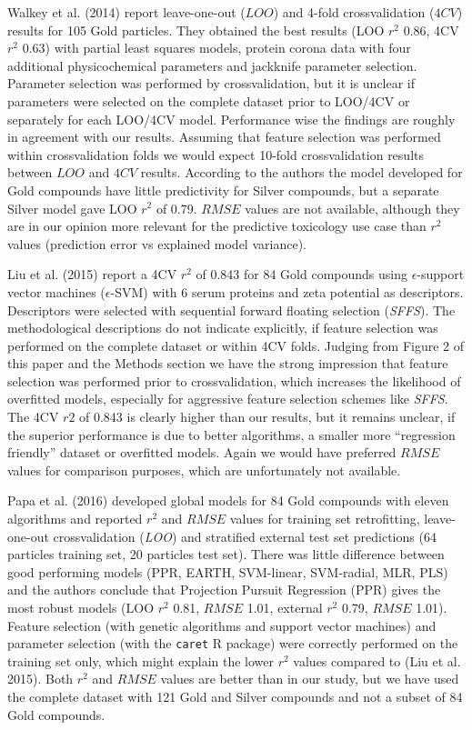 \documentclass[utf8]{frontiersHLTH} %
\begin{document}
Walkey et al. (2014) report leave-one-out (\(LOO\)) and 4-fold
crossvalidation (\(4CV\)) results for 105 Gold particles. They obtained
the best results (LOO \(r^2\) 0.86, 4CV \(r^2\) 0.63) with partial least
squares models, protein corona data with four additional physicochemical
parameters and jackknife parameter selection. Parameter selection was
performed by crossvalidation, but it is unclear if parameters were
selected on the complete dataset prior to LOO/4CV or separately for each
LOO/4CV model. Performance wise the findings are roughly in agreement
with our results. Assuming that feature selection was performed within
crossvalidation folds we would expect 10-fold crossvalidation results
between \(LOO\) and \(4CV\) results. According to the authors the model
developed for Gold compounds have little predictivity for Silver
compounds, but a separate Silver model gave LOO \(r^2\) of 0.79.
\(RMSE\) values are not available, although they are in our opinion more
relevant for the predictive toxicology use case than \(r^2\) values
(prediction error vs explained model variance).

Liu et al. (2015) report a 4CV \(r^2\) of 0.843 for 84 Gold compounds
using \(\epsilon\)-support vector machines (\(\epsilon\)-SVM) with 6
serum proteins and zeta potential as descriptors. Descriptors were
selected with sequential forward floating selection (\emph{SFFS}). The
methodological descriptions do not indicate explicitly, if feature
selection was performed on the complete dataset or within 4CV folds.
Judging from Figure 2 of this paper and the Methods section we have the
strong impression that feature selection was performed prior to
crossvalidation, which increases the likelihood of overfitted models,
especially for aggressive feature selection schemes like \emph{SFFS}.
The 4CV \(r2\) of 0.843 is clearly higher than our results, but it
remains unclear, if the superior performance is due to better
algorithms, a smaller more ``regression friendly'' dataset or overfitted
models. Again we would have preferred \(RMSE\) values for comparison
purposes, which are unfortunately not available.

Papa et al. (2016) developed global models for 84 Gold compounds with
eleven algorithms and reported \(r^2\) and \(RMSE\) values for training
set retrofitting, leave-one-out crossvalidation (\emph{LOO}) and
stratified external test set predictions (64 particles training set, 20
particles test set). There was little difference between good performing
models (PPR, EARTH, SVM-linear, SVM-radial, MLR, PLS) and the authors
conclude that Projection Pursuit Regression (PPR) gives the most robust
models (LOO \(r^2\) 0.81, \(RMSE\) 1.01, external \(r^2\) 0.79, \(RMSE\)
1.01). Feature selection (with genetic algorithms and support vector
machines) and parameter selection (with the \texttt{caret} R package)
were correctly performed on the training set only, which might explain
the lower \(r^2\) values compared to (Liu et al. 2015). Both \(r^2\) and
\(RMSE\) values are better than in our study, but we have used the
complete dataset with 121 Gold and Silver compounds and not a subset of
84 Gold compounds.
\end{document}
